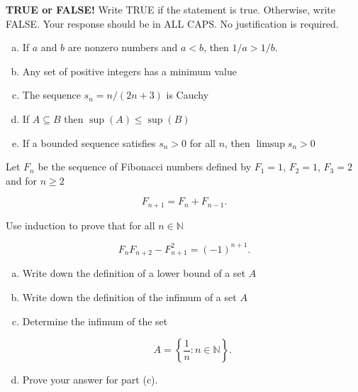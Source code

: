 \documentclass[11pt]{exam}
\theoremstyle{definition}
\begin{document}
\begin{questions}

\addpoints

\question[10]\mbox{}
\textbf{TRUE or FALSE!}  Write  TRUE if the statement is true.  Otherwise, write FALSE.  Your response should be in ALL CAPS.  No justification is required.
\begin{enumerate}[(a)]
\item  
If $a$ and $b$ are nonzero numbers and $a < b$, then $1/a > 1/b$.
\vspace{1.2in}
\item
Any set of positive integers has a minimum value
\vspace{1.2in}
\item
The sequence $s_n = n/(2n+3)$ is Cauchy
\vspace{1.2in}
\item
If $A\subseteq B$ then $\sup(A)\leq\sup(B)$
\vspace{1.2in}
\item  
If a bounded sequence satisfies $s_n > 0$ for all $n$, then $\limsup s_n > 0$
\vspace{1.2in}
\end{enumerate}

\newpage
\question[10]\mbox{}

Let $F_n$ be the sequence of Fibonacci numbers defined by $F_1 = 1$, $F_2=1$, $F_3=2$ and for $n \geq 2$

$$F_{n+1} = F_{n} + F_{n-1}.$$

Use induction to prove that for all $n\in\mathbb N$

$$F_nF_{n+2}-F_{n+1}^2=(-1)^{n+1}.$$

\newpage
\question[10]\mbox{}
\begin{enumerate}[(a)]
\item Write down the definition of a lower bound of a set $A$
\vspace{1in}
\item Write down the definition of the infimum of a set $A$
\vspace{1in}

\item Determine the infimum of the set 

$$A = \left\lbrace\frac{1}{n}: n\in\mathbb{N}\right\rbrace.$$
\vspace{1.3in}

\item Prove your answer for part (c).
\end{enumerate}


\end{questions}
\end{document}
